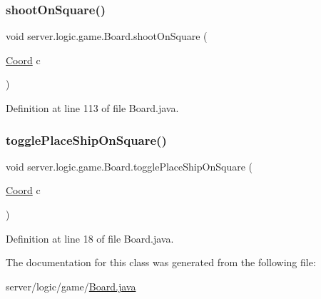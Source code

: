 \subsubsection{\texorpdfstring{shoot\+On\+Square()}{shootOnSquare()}}
{\footnotesize\ttfamily void server.\+logic.\+game.\+Board.\+shoot\+On\+Square (\begin{DoxyParamCaption}\item[{\hyperlink{classsharedlib_1_1utils_1_1_coord}{Coord}}]{c }\end{DoxyParamCaption})}



Definition at line 113 of file Board.\+java.

\hypertarget{classserver_1_1logic_1_1game_1_1_board_af74b65d15f58535175cba5586116e5ef}{}\label{classserver_1_1logic_1_1game_1_1_board_af74b65d15f58535175cba5586116e5ef} 
\subsubsection{\texorpdfstring{toggle\+Place\+Ship\+On\+Square()}{togglePlaceShipOnSquare()}}
{\footnotesize\ttfamily void server.\+logic.\+game.\+Board.\+toggle\+Place\+Ship\+On\+Square (\begin{DoxyParamCaption}\item[{\hyperlink{classsharedlib_1_1utils_1_1_coord}{Coord}}]{c }\end{DoxyParamCaption})}



Definition at line 18 of file Board.\+java.



The documentation for this class was generated from the following file\+:\begin{DoxyCompactItemize}
\item 
server/logic/game/\hyperlink{_board_8java}{Board.\+java}\end{DoxyCompactItemize}
